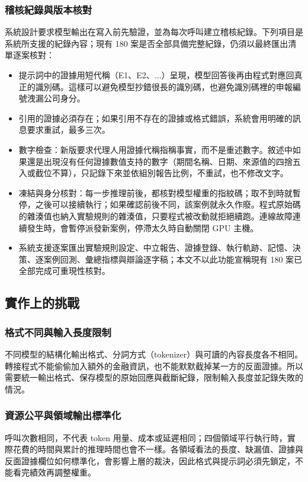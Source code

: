 \subsubsection{稽核紀錄與版本核對}
系統設計要求模型輸出在寫入前先驗證，並為每次呼叫建立稽核紀錄。下列項目是系統所支援的紀錄內容；現有 180 案是否全部具備完整紀錄，仍須以最終匯出清單逐案核對：

\begin{itemize}
  \item 提示詞中的證據用短代稱（E1、E2、$\ldots$）呈現，模型回答後再由程式對應回真正的識別碼。這樣可以避免模型抄錯很長的識別碼，也避免識別碼裡的申報編號洩漏公司身分。
  \item 引用的證據必須存在；如果引用不存在的證據或格式錯誤，系統會用明確的訊息要求重試，最多三次。
  \item 數字檢查：新版要求代理人用證據代稱指稱事實，而不是重述數字。敘述中如果還是出現沒有任何證據數值支持的數字（期間名稱、日期、來源值的四捨五入或截位不算），只記錄下來並依組別報告比例，不重試，也不修改文字。
  \item 凍結與身分核對：每一步推理前後，都核對模型權重的指紋碼；取不到時就暫停，之後可以接續執行；如果確認前後不同，該案例就永久作廢。程式原始碼的雜湊值也納入實驗規則的雜湊值，只要程式被改動就拒絕續跑。連線故障連續發生時，會暫停派發新案例，停滯太久時自動關閉 GPU 主機。
  \item 系統支援逐案匯出實驗規則設定、中立報告、證據登錄、執行軌跡、記憶、決策、逐案例回測、彙總指標與辯論逐字稿；本文不以此功能宣稱現有 180 案已全部完成可重現性核對。
\end{itemize}
\subsection{實作上的挑戰}

\subsubsection{格式不同與輸入長度限制}
不同模型的結構化輸出格式、分詞方式（tokenizer）與可讀的內容長度各不相同。轉接程式不能偷偷加入額外的金融資訊，也不能默默截掉某一方的反面證據。所以需要統一輸出格式、保存模型的原始回應與截斷紀錄，限制輸入長度並記錄失敗的情況。

\subsubsection{資源公平與領域輸出標準化}
呼叫次數相同，不代表 token 用量、成本或延遲相同；四個領域平行執行時，實際花費的時間與累計的推理時間也會不一樣。各領域看法的長度、缺漏值、證據與反面證據欄位如何標準化，會影響上層的裁決，因此格式與提示詞必須先鎖定，不能看完績效再調整權重。

